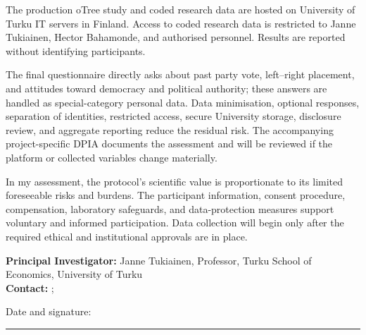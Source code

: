 The production oTree study and coded research data are hosted on University of Turku IT servers in Finland.  Access to coded research data is restricted to Janne Tukiainen, Hector Bahamonde, and authorised personnel. Results are reported without identifying participants. 

The final questionnaire directly asks about past party vote, left--right placement, and attitudes toward democracy and political authority; these answers are handled as special-category personal data. Data minimisation, optional responses, separation of identities, restricted access, secure University storage, disclosure review, and aggregate reporting reduce the residual risk. The accompanying project-specific DPIA documents the assessment and will be reviewed if the platform or collected variables change materially.

In my assessment, the protocol's scientific value is proportionate to its limited foreseeable risks and burdens. The participant information, consent procedure, compensation, laboratory safeguards, and data-protection measures support voluntary and informed participation. Data collection will begin only after the required ethical and institutional approvals are in place.

\vfill
\textbf{Principal Investigator:} Janne Tukiainen, Professor, Turku School of Economics, University of Turku\\
\textbf{Contact:} \StudyEmail; \StudyPhone

\vspace{1.2em}
Date and signature: \rule{9cm}{0.3pt}


